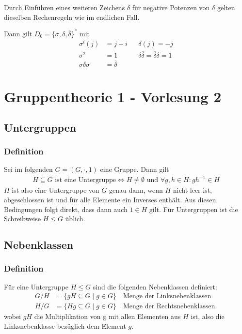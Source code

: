\documentclass[12pt, german]{article}
\begin{document}
	Durch Einführen eines weiteren Zeichens $\overline{\delta}$ für negative Potenzen von $\delta$ gelten dieselben Rechenregeln wie im endlichen Fall.
	
	Dann gilt $D_0 = \{\sigma, \delta, \overline{\delta}\}^*$ mit
	\begin{align*}
		\sigma^i(j) & = j+i &&\delta(j)  = -j \\
		\sigma^2 & = 1 &&\delta\overline{\delta} = \overline{\delta}\delta = 1 \\
		\sigma\delta\sigma & = \overline{\delta}
	\end{align*}
	
	\section{Gruppentheorie 1 - Vorlesung 2}
	\subsection{Untergruppen}
	\subsubsection{Definition}
	Sei im folgenden $G=(G, \cdot, 1)$ eine Gruppe. Dann gilt 
	\begin{align*}
		H \subseteq G \text{ ist eine Untergruppe} \iff H \not = \emptyset \text{ und } \forall g, h \in H : gh^{-1} \in H
	\end{align*}
	$H$ ist also eine Untergruppe von $G$ genau dann, wenn $H$ nicht leer ist, abgeschlossen ist und für alle Elemente ein Inverses enthält. Aus diesen Bedingungen folgt direkt, dass dann auch $1 \in H$ gilt.
	Für Untergruppen ist die Schreibweise $H\leq G$ üblich.
	
	
	\subsection{Nebenklassen}
	\subsubsection{Definition}
	Für eine Untergruppe $H \leq G$ sind die folgenden Nebenklassen definiert:
	\begin{align*}
		G/H &= \{gH \subseteq G \mid g \in G\} \quad \text{Menge der Linksnebenklassen } \\
		H/G &= \{Hg \subseteq G \mid g \in G\} \quad \text{Menge der Rechtsnebenklassen } 
	\end{align*}
	wobei $gH$ die Multiplikation von  g mit allen Elementen aus $H$ ist, also die Linksnebenklasse bezüglich dem Element $g$. 
	
\end{document}
